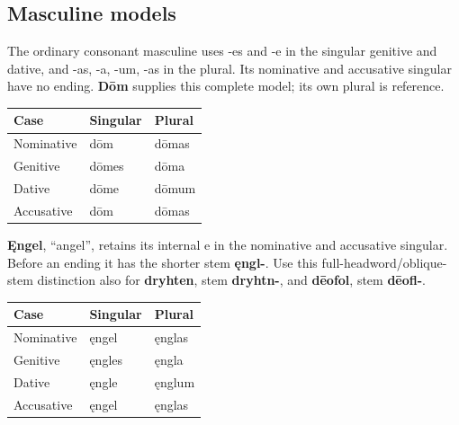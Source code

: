 \subsection*{Masculine models}

The ordinary consonant masculine uses -es and -e in the singular genitive and dative, and -as, -a, -um, -as in the plural. Its nominative and accusative singular have no ending. \textbf{Dōm} supplies this complete model; its own plural is reference.

\par\begingroup
\fontsize{10.5}{13.2}\selectfont
\setlength{\LTleft}{0pt}\setlength{\LTright}{\fill}
\noindent
\begin{tabular}{@{}>{\raggedright\arraybackslash}p{39.46mm}>{\raggedright\arraybackslash}p{39.46mm}>{\raggedright\arraybackslash}p{39.46mm}@{}}
\toprule
\textbf{Case} & \textbf{Singular} & \textbf{Plural} \\
\midrule
Nominative & dōm & dōmas \\
Genitive & dōmes & dōma \\
Dative & dōme & dōmum \\
Accusative & dōm & dōmas \\
\bottomrule
\end{tabular}
\par\endgroup

\textbf{Ęngel}, “angel”, retains its internal e in the nominative and accusative singular. Before an ending it has the shorter stem \textbf{ęngl-}. Use this full-headword/\allowbreak{}oblique-stem distinction also for \textbf{dryhten}, stem \textbf{dryhtn-}, and \textbf{dēofol}, stem \textbf{dēofl-}.

\par\begingroup
\fontsize{10.5}{13.2}\selectfont
\setlength{\LTleft}{0pt}\setlength{\LTright}{\fill}
\noindent
\begin{tabular}{@{}>{\raggedright\arraybackslash}p{39.46mm}>{\raggedright\arraybackslash}p{39.46mm}>{\raggedright\arraybackslash}p{39.46mm}@{}}
\toprule
\textbf{Case} & \textbf{Singular} & \textbf{Plural} \\
\midrule
Nominative & ęngel & ęnglas \\
Genitive & ęngles & ęngla \\
Dative & ęngle & ęnglum \\
Accusative & ęngel & ęnglas \\
\bottomrule
\end{tabular}
\par\endgroup

